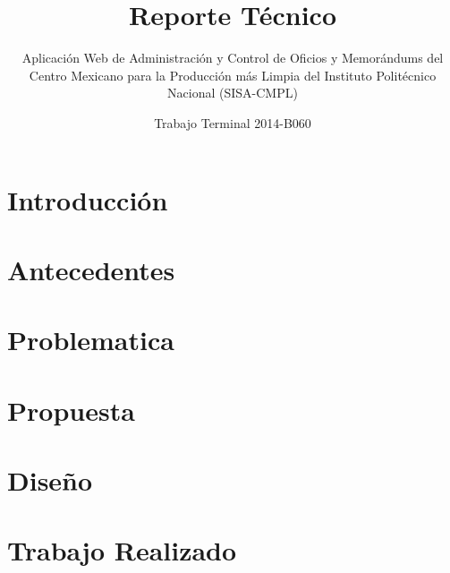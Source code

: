 \documentclass[oneside,10pt]{book}
\title{Reporte Técnico}
\subtitle{Aplicación Web de Administración y Control de Oficios y Memorándums del Centro Mexicano para la Producción más Limpia del Instituto Politécnico Nacional (SISA-CMPL)}
\author{Trabajo Terminal 2014-B060}
\begin{document}
\maketitle
\thispagestyle{empty}

\frontmatter
\tableofcontents

\mainmatter

\chapter{Introducción}


\chapter{Antecedentes}




\chapter{Problematica}


\chapter{Propuesta}


\chapter{Diseño}



\chapter{Trabajo Realizado}
\end{document}
